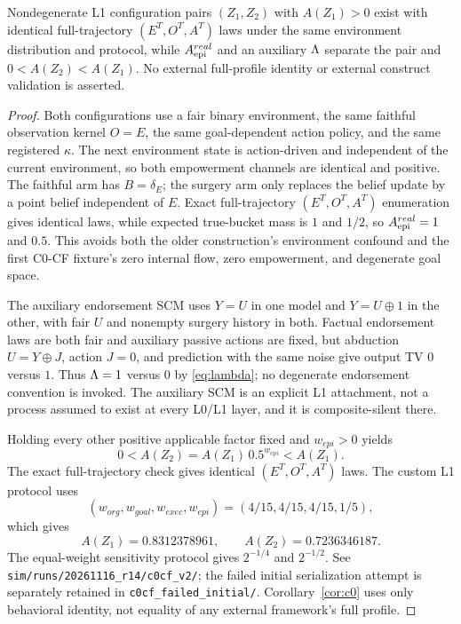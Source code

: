 \begin{proposition}
Nondegenerate L1 configuration pairs $(Z_1,Z_2)$ with $A(Z_1)>0$ exist with
identical full-trajectory $(E^T,O^T,A^T)$ laws under the same environment distribution
and protocol, while $A_{\mathrm{epi}}^{real}$ and an auxiliary $\Lambda$ separate the pair
and $0<A(Z_2)<A(Z_1)$. No external full-profile identity or external construct
validation is asserted.
\end{proposition}
\begin{proof}
Both configurations use a fair binary environment, the same faithful
observation kernel $O=E$, the same goal-dependent action policy, and the same
registered $\kappa$. The next environment state is action-driven and
independent of the current environment, so both empowerment channels are
identical and positive. The faithful arm has $B=\delta_E$; the surgery arm only
replaces the belief update by a point belief independent of $E$. Exact
full-trajectory $(E^T,O^T,A^T)$ enumeration gives identical laws, while
expected true-bucket mass is $1$ and $1/2$, so $A_{\mathrm{epi}}^{real}=1$ and $0.5$.
This avoids both the older construction's environment confound and the first
C0-CF fixture's zero internal flow, zero empowerment, and degenerate goal space.

The auxiliary endorsement SCM uses $Y=U$ in one model and $Y=U\oplus1$ in the
other, with fair $U$ and nonempty surgery history in both. Factual endorsement
laws are both fair and auxiliary passive actions are fixed, but abduction
$U=Y\oplus J$, action $J=0$, and prediction with the same noise give output TV
$0$ versus $1$. Thus $\Lambda=1$ versus $0$ by \eqref{eq:lambda}; no degenerate
endorsement convention is invoked. The auxiliary SCM is an explicit L1
attachment, not a process assumed to exist at every L0/L1 layer, and it is
composite-silent there.

Holding every other positive applicable factor fixed and $w_{epi}>0$ yields
\[
0<A(Z_2)=A(Z_1)\,0.5^{w_{epi}}<A(Z_1).
\]
The exact full-trajectory check gives identical $(E^T,O^T,A^T)$ laws. The
custom L1 protocol uses
\[
(w_{org},w_{goal},w_{exec},w_{epi})=(4/15,4/15,4/15,1/5),
\]
which gives
\[
A(Z_1)=0.8312378961,\qquad A(Z_2)=0.7236346187.
\]
The equal-weight sensitivity protocol gives $2^{-1/4}$ and $2^{-1/2}$.
See \texttt{sim/runs/20261116\_r14/c0cf\_v2/}; the failed initial
serialization attempt is separately retained in
\texttt{c0cf\_failed\_initial/}. Corollary~\ref{cor:c0} uses only behavioral
identity, not equality of any external framework's full profile.
\end{proof}

